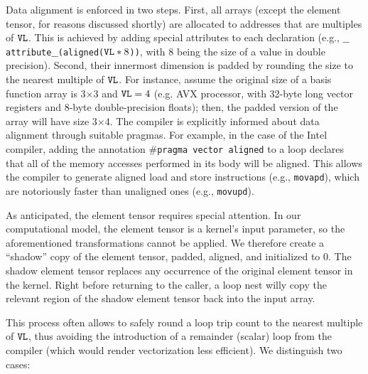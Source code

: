 Data alignment is enforced in two steps. First, all arrays (except the element tensor, for reasons discussed shortly) are allocated to addresses that are multiples of $\mbox{\texttt{VL}}$. This is achieved by adding special attributes to each declaration (e.g., {\tt $\_\_$attribute$\_\_$(aligned($\mbox{\texttt{VL}}*8$))}, with $8$ being the size of a value in double precision). Second, their innermost dimension is padded by rounding the size to the nearest multiple of $\mbox{\texttt{VL}}$. For instance, assume the original size of a basis function array is 3$\times$3 and $\mbox{\texttt{VL}}=4$ (e.g. AVX processor, with 32-byte long vector registers and 8-byte double-precision floats); then, the padded version of the array will have size 3$\times$4. The compiler is explicitly informed about data alignment through suitable pragmas. For example, in the case of the Intel compiler, adding the annotation \texttt{$\#$pragma vector aligned} to a loop declares that all of the memory accesses performed in its body will be aligned. This allows the compiler to generate aligned load and store instructions (e.g., {\tt movapd}), which are notoriously faster than unaligned ones (e.g., {\tt movupd}).

As anticipated, the element tensor requires special attention. In our computational model, the element tensor is a kernel's input parameter, so the aforementioned transformations cannot be applied. We therefore create a ``shadow'' copy of the element tensor, padded, aligned, and initialized to 0. The shadow element tensor replaces any occurrence of the original element tensor in the kernel. Right before returning to the caller, a loop nest willy copy the relevant region of the shadow element tensor back into the input array.

This process often allows to safely round a loop trip count to the nearest multiple of $\mbox{\texttt{VL}}$, thus avoiding the introduction of a remainder (scalar) loop from the compiler (which would render vectorization less efficient). We distinguish two cases:

